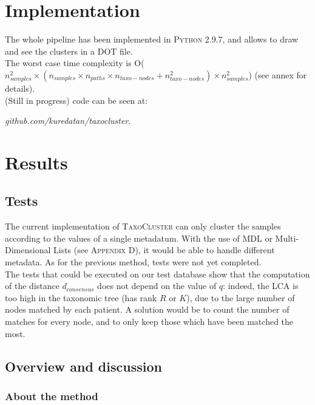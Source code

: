 \documentclass{report}
\begin{document}
\section{Implementation}

The whole pipeline has been implemented in \textsc{Python 2.9.7}, and allows to draw and see the clusters in a DOT file.\\

The worst case time complexity is O($n_{samples}^{2} \times (n_{samples} \times n_{paths} \times n_{taxo-nodes} + n_{taxo-nodes}^{2}) \times n_{samples}^{2}$) (see annex for details).\\

(Still in progress) code can be seen at: \\\begin{center}\emph{github.com/kuredatan/taxocluster}.\end{center}

\section{Results}

\subsection{Tests}

The current implementation of \textsc{TaxoCluster} can only cluster the samples according to the values of a single metadatum. With the use of MDL or Multi-Dimensional Lists (see \textsc{Appendix D}), it would be able to handle different metadata. As for the previous method, tests were not yet completed.\\

The tests that could be executed on our test database show that the computation of the distance $d_{consensus}$ does not depend on the value of $q$: indeed, the LCA is too high in the taxonomic tree (has rank $R$ or $K$), due to the large number of nodes matched by each patient. A solution would be to count the number of matches for every node, and to only keep those which have been matched the most.\\ 

\subsection{Overview and discussion}

\subsubsection{About the method}
\end{document}
